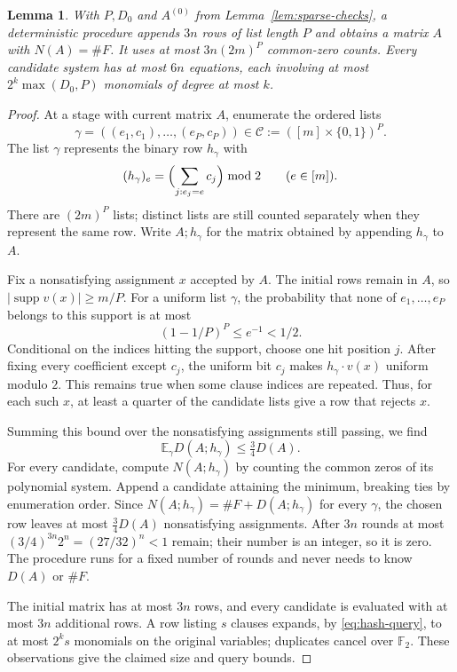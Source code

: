 \documentclass[11pt,reqno]{amsart}
\numberwithin{equation}{section}
\newtheorem{lemma}[theorem]{Lemma}
\theoremstyle{definition}\newtheorem{definition}[theorem]{Definition}
\theoremstyle{remark}\newtheorem{remark}[theorem]{Remark}
\renewcommand{\le}{\leqslant}
\renewcommand{\ge}{\geqslant}
\begin{document}
\begin{lemma}\label{lem:greedy-hashes}
With $P,D_0$ and $A^{(0)}$ from Lemma~\ref{lem:sparse-checks}, a
deterministic procedure appends $3n$ rows of list length $P$ and
obtains a matrix $A$ with $N(A)=\#F$. It uses at most $3n(2m)^P$
common-zero counts. Every candidate system has at most $6n$ equations,
each involving at most $2^k\max(D_0,P)$ monomials of degree at most $k$.
\end{lemma}
\begin{proof}
At a stage with current matrix $A$, enumerate the ordered lists
\[
 \gamma=((e_1,c_1),\ldots,(e_P,c_P))
 \in\mathcal C:=([m]\times\{0,1\})^P.
\]
The list $\gamma$ represents the binary row $h_\gamma$ with
\[
 (h_\gamma)_e=
 \Bigl(\sum_{j:e_j=e}c_j\Bigr)\bmod2
 \qquad(e\in[m]).
\]
There are $(2m)^P$ lists; distinct lists are still counted separately
when they represent the same row. Write $A;h_\gamma$ for the matrix obtained by appending $h_\gamma$ to $A$.

Fix a nonsatisfying assignment $x$ accepted by $A$. The initial
rows remain in $A$, so
$|\operatorname{supp}v(x)|\ge m/P$.
For a uniform list $\gamma$, the probability that none of
$e_1,\ldots,e_P$ belongs to this support is at most
\[
 (1-1/P)^P\le e^{-1}<1/2.
\]
Conditional on the indices hitting the support, choose one hit
position $j$. After fixing every coefficient except $c_j$, the
uniform bit $c_j$ makes $h_\gamma\cdot v(x)$ uniform modulo $2$.
This remains true when some clause indices are repeated.
Thus, for each such $x$, at least a quarter of the candidate lists
give a row that rejects $x$.

Summing this bound over the nonsatisfying assignments still passing,
we find
\[
 \mathbb E_\gamma D(A;h_\gamma)\le\tfrac34 D(A).
\]
For every candidate, compute $N(A;h_\gamma)$ by counting the common
zeros of its polynomial system. Append a candidate attaining the
minimum, breaking ties by enumeration order. Since
$N(A;h_\gamma)=\#F+D(A;h_\gamma)$ for every $\gamma$, the chosen row
leaves at most $\tfrac34 D(A)$ nonsatisfying assignments. After $3n$
rounds at most $(3/4)^{3n}2^n=(27/32)^n<1$ remain; their number is
an integer, so it is zero. The procedure runs for a fixed number of
rounds and never needs to know $D(A)$ or $\#F$.

The initial matrix has at most $3n$ rows, and every candidate is
evaluated with at most $3n$ additional rows. A row listing $s$
clauses expands, by \eqref{eq:hash-query}, to at most $2^k s$
monomials on the original variables; duplicates cancel over
$\mathbb F_2$. These observations give the claimed size and query
bounds.
\end{proof}
\end{document}
